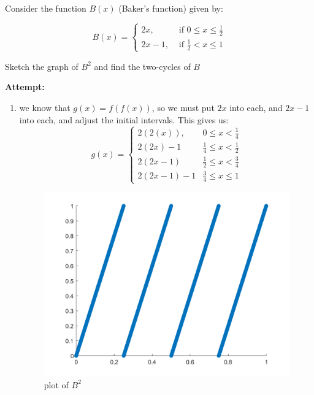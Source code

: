 \documentclass[12pt,letterpaper]{article}
\theoremstyle{definition}
\begin{document}
Consider the function $B(x)$ (Baker's function) given by:

\begin{equation*}
    B(x) = \begin{cases}
    2x, & \text{ if } 0\leq x \leq \frac 1 2 \\
    2x-1, & \text{ if } \frac 1 2 < x \leq 1
    \end{cases}
\end{equation*}

Sketch the graph of $B^2$ and find the two-cycles of $B$

    
  \textbf{Attempt:}
    \begin{changemargin}{.5cm}{0cm}
    
    \begin{enumerate}[label=(\alph*)]
    \item
    we know that $g(x) = f(f(x))$, so we must put $2x$ into each, and $2x-1$ into each, and adjust the initial intervals. This gives us: \begin{equation*}
        g(x) = \begin{cases}
         2(2(x)), & 0\leq x < \frac 1 4\\
         2(2x)-1 & \frac 1 4 \leq x < \frac 1 2 \\
          2(2x-1)& \frac 1 2 \leq x < \frac 3 4\\
         2(2x-1)-1 & \frac 3 4 \leq x \leq 1
        \end{cases}
    \end{equation*}
    \begin{figure}[H]
        \centering
       \includegraphics[width=.6\textwidth]{images/problem_15_b2.png}
        \caption{plot of $B^2$}
        \label{fig:b2}
    \end{figure}
    

\end{enumerate}
\end{changemargin}
\end{document}
